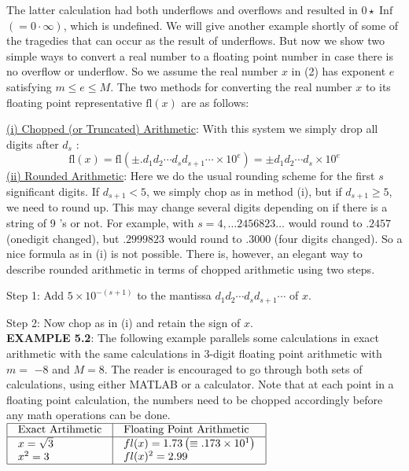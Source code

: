 \documentclass[../main.tex]{subfiles}
\begin{document}
The latter calculation had both underflows and overflows and resulted in $0 \star \operatorname{Inf}$ $(=0 \cdot \infty)$, which is undefined. We will give another example shortly of some of the tragedies that can occur as the result of underflows. But now we show two simple ways to convert a real number to a floating point number in case there is no overflow or underflow. So we assume the real number $x$ in (2) has exponent $e$ satisfying $m \leq e \leq M$. The two methods for converting the real number $x$ to its floating point representative $\mathrm{fl}(x)$ are as follows:

\underline{(i) Chopped (or Truncated) Arithmetic}: With this system we simply drop all digits after $d_{s}$ :
$$
\mathrm{fl}(x)=\mathrm{fl}\left(\pm . d_{1} d_{2} \cdots d_{s} d_{s+1} \cdots \times 10^{e}\right)=\pm d_{1} d_{2} \cdots d_{s} \times 10^{e}
$$
\underline{(ii) Rounded Arithmetic}: Here we do the usual rounding scheme for the first $s$ significant digits. If $d_{s+1}<5$, we simply chop as in method (i), but if $d_{s+1} \geq 5$, we need to round up. This may change several digits depending on if there is a string of 9 's or not. For example, with $s=4, \ldots 2456823 \ldots$ would round to $.2457$ (onedigit changed), but $.2999823$ would round to $.3000$ (four digits changed). So a nice formula as in (i) is not possible. There is, however, an elegant way to describe rounded arithmetic in terms of chopped arithmetic using two steps.

Step 1: Add $5 \times 10^{-(s+1)}$ to the mantissa $d_{1} d_{2} \cdots d_{s} d_{s+1} \cdots$ of $x$.

Step 2: Now chop as in (i) and retain the sign of $x$.\\

\textbf{EXAMPLE 5.2}: The following example parallels some calculations in exact arithmetic with the same calculations in 3-digit floating point arithmetic with $m=$ $-8$ and $M=8$. The reader is encouraged to go through both sets of calculations, using either MATLAB or a calculator. Note that at each point in a floating point calculation, the numbers need to be chopped accordingly before any math operations can be done.\\

$
\begin{array}{|l|l|}
\hline \begin{array}{l}
\text {Exact Artihmetic}
\end{array} & \begin{array}{l}
\text{Floating Point Arithmetic}
\end{array} \\
\hline \begin{array}{l}
\text {$x=\sqrt{3}$} \\
\text{$x^{2}=3$} \\
\end{array} & \begin{array}{l}
\text{$f l(x)=1.73\left(\equiv .173 \times 10^{1}\right)$}\\
\text{$f l(x)^{2}=2.99$}
\end{array} \\
\hline
\end{array}
$ \\
\end{document}
